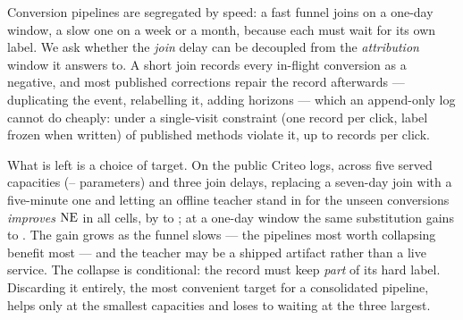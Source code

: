 Conversion pipelines are segregated by speed: a fast funnel joins on a one-day window, a slow
one on a week or a month, because each must wait for its own label. We ask whether the
\emph{join} delay can be decoupled from the \emph{attribution} window it answers to. A short join records every in-flight conversion as a negative, and most published
corrections repair the record afterwards --- duplicating the event, relabelling it, adding
horizons --- which an append-only log cannot do cheaply: under a single-visit constraint (one
record per click, label frozen when written) \nFail{} of \nScreened{} published methods violate
it, up to \maxDup{} records per click.

What is left is a choice of target. On the public Criteo logs, across five served capacities
(\capMin{}--\capMax{} parameters) and three join delays, replacing a seven-day join with a
five-minute one and letting an offline teacher stand in for the unseen conversions
\emph{improves} $\mathrm{NE}$ in all \nContrast{} cells, by \collapseSevenBest{} to
\collapseSevenWorst{}; at a one-day window the same substitution gains \collapseOneBest{} to
\collapseOneWorst{}. The gain grows as the funnel slows --- the pipelines most worth collapsing
benefit most --- and the teacher may be a shipped artifact rather than a live service. The
collapse is conditional: the record must keep \emph{part} of its hard label. Discarding it
entirely, the most convenient target for a consolidated pipeline, helps only at the smallest
capacities and loses to waiting at the three largest.
